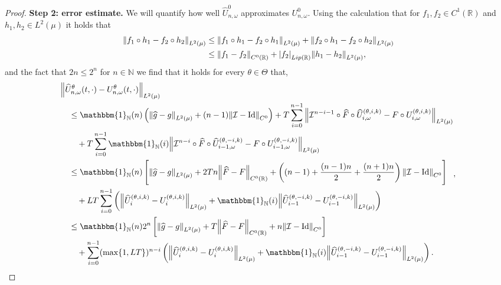 \documentclass{article}
\numberwithin{equation}{section}
\newcommand{\Id}{\mathrm{Id}}
\newcommand{\R}{\mathbb{R}}
\newcommand{\N}{\mathbb{N}}
\newcommand{\cI}{\mathcal{I}}
\newcommand{\mlp}{U}
\newcommand{\1}{\mathbbm{1}}
\newcommand{\Fhat}{\widehat{F}}
\newcommand{\Uhat}{\widehat{U}}
\newcommand{\ghat}{\widehat{g}}
\begin{document}
\begin{proof}
\textbf{Step 2: error estimate. }
We will quantify how well $\Uhat_{n,\omega}^0$ approximates $\mlp_{n,\omega}^0$. Using the calculation that for $f_1,f_2\in  C^1(\R)$ and $h_1, h_2\in L^2(\mu)$ it holds that
\begin{equation}
\begin{split}
\norm{f_1\circ h_1 - f_2\circ h_2}_{L^2(\mu)} &\leq \norm{f_1\circ h_1 - f_2\circ h_1}_{L^2(\mu)} + \norm{f_2\circ h_1 - f_2\circ h_2}_{L^2(\mu)}\\
&\leq \norm{f_1-f_2}_{C^0(\R)} + \abs{f_2}_{Lip(\R)}\norm{h_1-h_2}_{L^2(\mu)}, 
\end{split}
\end{equation}
and the fact that $2n\leq 2^n$ for $n\in\N$ we find that it holds for every $\theta\in\Theta$ that,
\begin{equation}\label{eq:uhat-un-calc}
\begin{split}
    &\norm{\Uhat_{n,\omega}^\theta(t,\cdot)-U^\theta_{n,\omega}(t,\cdot)}_{L^2(\mu)} \\ & \quad \leq \1_\N(n) \left(\norm{\ghat-g}_{L^2(\mu)}+(n-1)\norm{\cI-\Id}_{C^0}\right)
    + T \sum_{i=0}^{n-1} \norm{\cI^{n-i-1}\circ\Fhat\circ \Uhat_{i,\omega}^{(\theta,i,k)}-F\circ U_{i,\omega}^{(\theta,i,k)}}_{L^2(\mu)} \\& \qquad + T \sum_{i=0}^{n-1}\1_\N(i) \norm{\cI^{n-i}\circ\Fhat\circ \Uhat_{i-1,\omega}^{(\theta,-i,k)}-F\circ U_{i-1,\omega}^{(\theta,-i,k)}}_{L^2(\mu)} \\
    & \quad \leq \1_\N(n) \left[\norm{\ghat-g}_{L^2(\mu)} + 2Tn\norm{\Fhat-F}_{C^0(\R)}+ \left((n-1)+\frac{(n-1)n}{2}+\frac{(n+1)n}{2}\right)\norm{\cI-\Id}_{C^0}\right]\\
    &\qquad + LT \sum_{i=0}^{n-1}\left(\norm{\Uhat_i^{(\theta,i,k)}- U_i^{(\theta,i,k)}}_{L^2(\mu)} + \1_\N(i)\norm{ \Uhat_{i-1}^{(\theta,-i,k)}- U_{i-1}^{(\theta,-i,k)}}_{L^2(\mu)} \right)\\
    & \quad \leq \1_\N(n)2^n \left[\norm{\ghat-g}_{L^2(\mu)} + T\norm{\Fhat-F}_{C^0(\R)}+ n\norm{\cI-\Id}_{C^0}\right]\\
    &\qquad + \sum_{i=0}^{n-1} (\max\{1,LT\})^{n-i} \left(\norm{\Uhat_i^{(\theta,i,k)}- U_i^{(\theta,i,k)}}_{L^2(\mu)} + \1_\N(i)\norm{ \Uhat_{i-1}^{(\theta,-i,k)}- U_{i-1}^{(\theta,-i,k)}}_{L^2(\mu)} \right).
\end{split}, 
\end{equation}


\end{proof}
\end{document}
